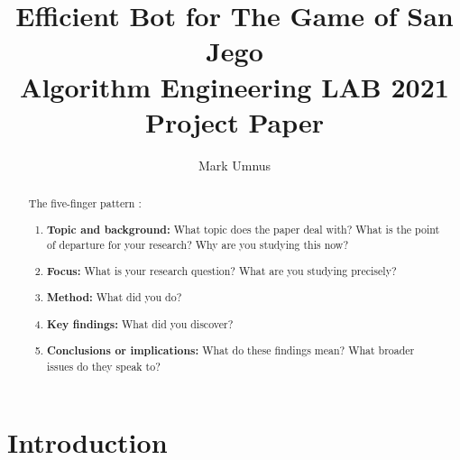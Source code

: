 \documentclass[sigconf]{acmart}
\begin{document}
\title[San Jego]{Efficient Bot for The Game of San Jego\\\large Algorithm Engineering LAB 2021 Project Paper}

\author{Mark Umnus}

\begin{abstract}

The five-finger pattern \cite{macgilchrist2014}:
\begin{enumerate}
\item \textbf{Topic and background:} What topic does the paper deal with? What is the point of departure for your research? Why are you studying this now?
\item \textbf{Focus:} What is your research question? What are you studying precisely?
\item \textbf{Method:} What did you do?
\item \textbf{Key findings:} What did you discover?
\item \textbf{Conclusions or implications:} What do these findings mean? What broader issues do they speak to?
\end{enumerate}


\end{abstract}



\maketitle

\let\thefootnote\relax{}


\section{Introduction}
\end{document}
